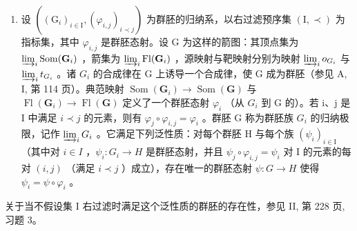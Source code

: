 \begin{enumerate}
\def\labelenumi{\arabic{enumi})}
\setcounter{enumi}{4}
\tightlist
\item
  设 \(((\mathrm{G}_{i})_{i\in\mathrm{I}},(\varphi_{i,j})_{i\prec j})\) 为群胚的归纳系，以右过滤预序集 \((\mathrm{I},\prec)\) 为指标集，其中 \(\varphi_{i,j}\) 是群胚态射。设 G 为这样的箭图：其顶点集为 \(\varinjlim_{i}\operatorname{Som}(\mathbf{G}_{i})\) ，箭集为 \(\varinjlim_{i}\operatorname{Fl}(\mathbf{G}_{i})\) ，源映射与靶映射分别为映射 \(\varinjlim_{i}o_{G_{i}}\) 与 \(\varinjlim_{i}t_{G_{i}}\) 。诸 \(G_{i}\) 的合成律在 G 上诱导一个合成律，使 G 成为群胚（参见 A, I, 第 114 页）。典范映射 \(\operatorname{Som}(\mathbf{G}_{i})\to\operatorname{Som}(\mathbf{G})\) 与 \(\operatorname{Fl}(\mathbf{G}_{i})\to\operatorname{Fl}(\mathbf{G})\) 定义了一个群胚态射 \(\varphi_{i}\) （从 \(G_{i}\) 到 G 的）。若 i、j 是 I 中满足 \(i\prec j\) 的元素，则有 \(\varphi_{j}\circ\varphi_{i,j}=\varphi_{i}\) 。群胚 G 称为群胚族 \(G_{i}\) 的归纳极限，记作 \(\varinjlim_{i}G_{i}\) 。它满足下列泛性质：对每个群胚 H 与每个族 \((\psi_{i})_{i\in\mathrm{I}}\) （其中对 \(i\in I\) ，\(\psi_{i}:G_{i}\to H\) 是群胚态射，并且 \(\psi_{j}\circ\varphi_{i,j}=\psi_{i}\) 对 I 的元素的每对 \((i,j)\) （满足 \(i\prec j\) ）成立），存在唯一的群胚态射 \(\psi:G\to H\) 使得 \(\psi_{i}=\psi\circ\varphi_{i}\) 。
\end{enumerate}

关于当不假设集 I 右过滤时满足这个泛性质的群胚的存在性，参见 II, 第 228 页, 习题 3。
\relax{}
